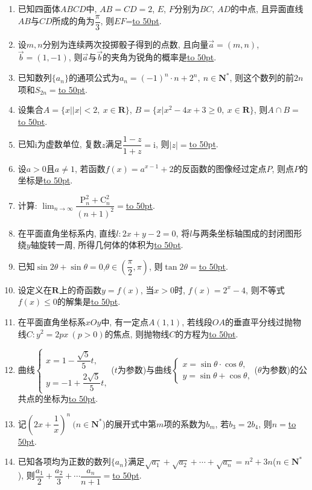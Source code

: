 \documentclass[10pt,a4paper]{article}
\newcommand{\blank}[1]{\underline{\hbox to #1pt{}}}
\begin{document}
\begin{enumerate}[1.]
\begin{center}
\end{center}
\item 已知四面体$ABCD$中, $AB=CD=2$, $E$, $F$分别为$BC$, $AD$的中点, 且异面直线$AB$与$CD$所成的角为$\dfrac{\pi}3$, 则$EF$=\blank{50}.
\item 设$m,n$分别为连续两次投掷骰子得到的点数, 且向量$\overrightarrow a=(m,n)$,$\overrightarrow b=(1,-1)$, 则$\overrightarrow a$与$\overrightarrow b$的夹角为锐角的概率是\blank{50}.
\item 已知数列$\{a_n\}$的通项公式为$a_n={(-1)}^n\cdot n+2^n, \ n\in \mathbf{N}^*$, 则这个数列的前$2n$项和$S_{2n}=$\blank{50}.


\item 设集合$A=\{x||x|<2,\ x\in \mathbf{R}\}$, $B=\{x|x^2-4x+3\ge 0, \ x\in \mathbf{R}\}$, 则$A\cap B=$\blank{50}.
\item 已知$\mathrm{i}$为虚数单位, 复数$z$满足$\dfrac{1-z}{1+z}=\mathrm{i}$, 则$|z|=$\blank{50}.
\item 设$a>0$且$a\ne 1$, 若函数$f(x)=a^{x-1}+2$的反函数的图像经过定点$P$, 则点$P$的坐标是\blank{50}.
\item 计算: $\displaystyle\lim_{n\to\infty}\dfrac{\mathrm{P}_n^2+\mathrm{C}_n^2}{(n+1)^2}=$\blank{50}.
\item 在平面直角坐标系内, 直线$l:2x+y-2=0$, 将$l$与两条坐标轴围成的封闭图形绕$y$轴旋转一周, 所得几何体的体积为\blank{50}.
\item 已知$\sin 2\theta +\sin\theta =0$,$\theta \in (\dfrac{\pi}2,\pi)$, 则$\tan 2\theta =$\blank{50}.
\item 设定义在$\mathbf{R}$上的奇函数$y=f(x)$, 当$x>0$时, $f(x)=2^x-4$, 则不等式$f(x)\le 0$的解集是\blank{50}.
\item 在平面直角坐标系$xOy$中, 有一定点$A(1,1)$, 若线段$OA$的垂直平分线过抛物线$C:y^2=2px \ (p>0)$的焦点, 则抛物线$C$的方程为\blank{50}.
\item 曲线$\begin{cases} x=1-\dfrac{\sqrt5}5 t, \\ y=-1+\dfrac{2\sqrt5}5t, \end{cases}$($t$为参数)与曲线$\begin{cases} x=\sin \theta \cdot \cos \theta, \\ y=\sin \theta +\cos \theta,  \end{cases}$($\theta$为参数)的公共点的坐标为\blank{50}.
\item 记$(2x+\dfrac1x)^n \ (n\in \mathbf{N}^*$)的展开式中第$m$项的系数为$b_m$, 若$b_3=2b_4$, 则$n=$\blank{50}.
\item 已知各项均为正数的数列$\{a_n\}$满足$\sqrt{a_1}+\sqrt{a_2}+\cdots+\sqrt{a_n}=n^2+3n$($n\in \mathbf{N}^*$), 则$\dfrac{a_1}2+\dfrac{a_2}3+\cdots \dfrac{a_n}{n+1}=$\blank{50}.


\end{enumerate}
\end{document}
